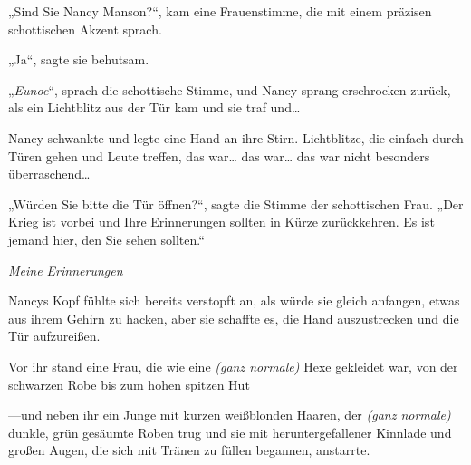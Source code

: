 „Sind Sie Nancy Manson?“, kam eine Frauenstimme, die mit einem präzisen schottischen Akzent sprach.

„Ja“, sagte sie behutsam.

„\emph{Eunoe}“, sprach die schottische Stimme, und Nancy sprang erschrocken zurück, als ein Lichtblitz aus der Tür kam und sie traf und…

Nancy schwankte und legte eine Hand an ihre Stirn. Lichtblitze, die einfach durch Türen gehen und Leute treffen, das war… das war… das war nicht besonders überraschend…

„Würden Sie bitte die Tür öffnen?“, sagte die Stimme der schottischen Frau. „Der Krieg ist vorbei und Ihre Erinnerungen sollten in Kürze zurückkehren. Es ist jemand hier, den Sie sehen sollten.“

\emph{Meine Erinnerungen}

Nancys Kopf fühlte sich bereits verstopft an, als würde sie gleich anfangen, etwas aus ihrem Gehirn zu hacken, aber sie schaffte es, die Hand auszustrecken und die Tür aufzureißen.

Vor ihr stand eine Frau, die wie eine \emph{(ganz normale)} Hexe gekleidet war, von der schwarzen Robe bis zum hohen spitzen Hut

—und neben ihr ein Junge mit kurzen weißblonden Haaren, der \emph{(ganz normale)} dunkle, grün gesäumte Roben trug und sie mit heruntergefallener Kinnlade und großen Augen, die sich mit Tränen zu füllen begannen, anstarrte.

